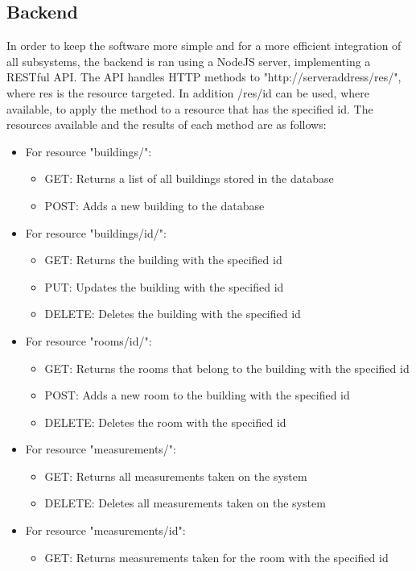 \subsection{Backend}
In order to keep the software more simple and for a more efficient integration of all subsystems, the backend is ran using a NodeJS server, implementing a RESTful API.
The API handles HTTP methods to "http://serveraddress/res/", where res is the resource targeted. In addition /res/id can be used, where available, to apply the method to a resource that has the specified id.
The resources available and the results of each method are as follows:
\begin{itemize}
\item For resource "buildings/":
	\begin{itemize}
	\item GET: Returns a list of all buildings stored in the database
	\item POST: Adds a new building to the database
	\end{itemize}
\item For resource "buildings/id/":
	\begin{itemize}
	\item GET: Returns the building with the specified id
	\item PUT: Updates the building with the specified id
	\item DELETE: Deletes the building with the specified id
	\end{itemize}
\item For resource "rooms/id/":
	\begin{itemize}
	\item GET: Returns the rooms that belong to the building with the specified id
	\item POST: Adds a new room to the building with the specified id
	\item DELETE: Deletes the room with the specified id
	\end{itemize}
\item For resource "measurements/":
	\begin{itemize}
	\item GET: Returns all measurements taken on the system
	\item DELETE: Deletes all measurements taken on the system
	\end{itemize}
\item For resource "measurements/id":
	\begin{itemize}
	\item GET: Returns measurements taken for the room with the specified id

\end{itemize}
\end{itemize}
